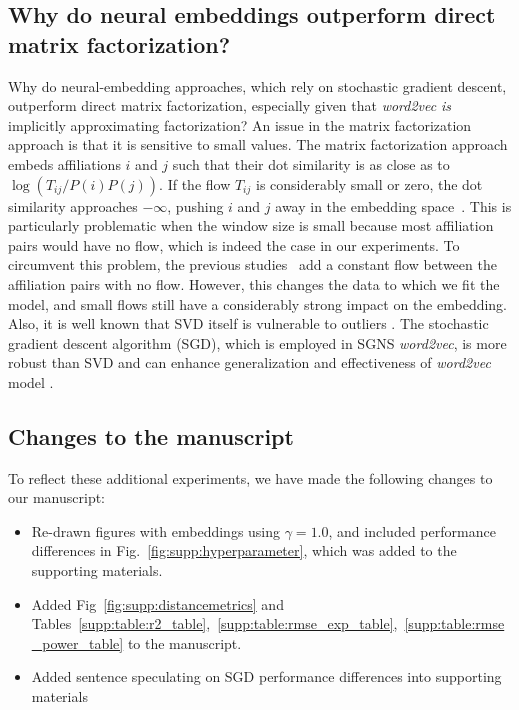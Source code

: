 \documentclass[12pt,draft,a4paper]{article}
\begin{document}
\subsection{Why do neural embeddings outperform direct matrix factorization?}
Why do neural-embedding approaches, which rely on stochastic gradient descent, outperform direct matrix factorization, especially given that \textit{word2vec} \emph{is} implicitly approximating factorization?
An issue in the matrix factorization approach is that it is sensitive to small values. The matrix factorization approach embeds affiliations $i$ and $j$ such that their dot similarity is as close as to $\log (T_{ij} / P(i) P(j))$. If the flow $T_{ij}$ is considerably small or zero, the dot similarity approaches $-\infty$, pushing $i$ and $j$ away in the embedding space~\autocite{levy2014neural, Qui2018}. This is particularly problematic when the window size is small because most affiliation pairs would have no flow, which is indeed the case in our experiments. To circumvent this problem, the previous studies~\autocite{levy2014neural, Qui2018} add a constant flow between the affiliation pairs with no flow. However, this changes the data to which we fit the model, and small flows still have a considerably strong impact on the embedding. Also, it is well known that SVD itself is vulnerable to outliers \autocite{xu2012robust, huber1981robust, xu1995robust, chandrasekaran2011rank, candes2011robust}.
The stochastic gradient descent algorithm (SGD), which is employed in SGNS \textit{word2vec}, is more robust than SVD and can enhance generalization and effectiveness of {\it word2vec} model \autocite{ma2018power, smith2020generalization, zhang2019algorithmic}.


\subsection{Changes to the manuscript}
To reflect these additional experiments, we have made the following changes to our manuscript:
\begin{itemize}
	\item Re-drawn figures with embeddings using $\gamma = 1.0$, and included performance differences in Fig.~\ref{fig:supp:hyperparameter}, which was added to the supporting materials.
	\item Added Fig~\ref{fig:supp:distancemetrics} and Tables~\ref{supp:table:r2_table},~\ref{supp:table:rmse_exp_table},~\ref{supp:table:rmse_power_table} to the manuscript.
	\item Added sentence speculating on SGD performance differences into supporting materials
\end{itemize}
\end{document}
